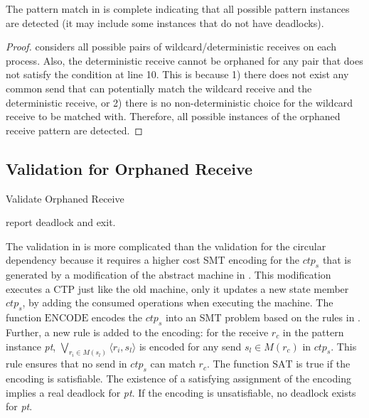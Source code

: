 
\begin{lemma}
\label{lemma:pmorphaned}
The pattern match in  is complete indicating that all possible pattern instances are detected (it may include some instances that do not have deadlocks).
\end{lemma}
\begin{proof}
 considers all possible pairs of wildcard/deterministic receives on each process. Also, the deterministic receive cannot be orphaned for any pair that does not satisfy the condition at line 10. This is because 1) there does not exist any common send that can potentially match the wildcard receive and the deterministic receive, or 2) there is no non-deterministic choice for the wildcard receive to be matched with. 
Therefore, all possible instances of the orphaned receive pattern are detected. 
\end{proof}

\subsection{Validation for Orphaned Receive}

\begin{algorithm}
\caption{Validate Orphaned Receive}\label{algo:vorphaned}
\begin{algorithmic}[1]
\State report deadlock and exit.
\EndIf
\end{algorithmic}
\end{algorithm}

The validation in  is more complicated than the validation for the circular dependency because it requires a higher cost SMT encoding for the $\mathit{ctp_s}$ that is generated by a modification of the abstract machine in .
This modification executes a CTP just like the old machine, only it updates a new state member $\mathit{ctp_s}$, by adding the consumed operations when executing the machine.
The function $\mathrm{ENCODE}$ encodes the $\mathit{ctp_s}$ into an SMT problem based on the rules in \cite{DBLP:conf/kbse/HuangMM13}. Further, a new rule is added to the encoding: for the receive $\mathit{r_c}$ in the pattern instance \textit{pt}, $\bigvee_{\mathit{r_i}\in\mathit{M}(\mathit{s_l})}\langle\mathit{r_i},\mathit{s_l}\rangle$ is encoded for any send $\mathit{s_l}\in\mathit{M}(\mathit{r_c})$ in $\mathit{ctp_s}$. This rule ensures that no send in $\mathit{ctp_s}$ can match $\mathit{r_c}$. The function $\mathrm{SAT}$ is true if the encoding is satisfiable. The existence of a satisfying assignment of the encoding implies a real deadlock for \textit{pt}. If the encoding is unsatisfiable, no deadlock exists for \textit{pt}.

